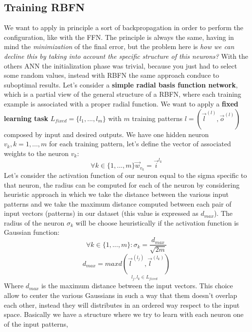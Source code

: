 \documentclass{article}
\begin{document}
\subsection{Training RBFN}
We want to apply in principle a sort of backpropagation in order to perform the configuration,
like with the FFN.
The principle is always the same, having in mind the \textit{minimization} of the final error,
but the problem here is \textit{how we can decline this by taking into account the
    specific structure of this neurons?}
With the others ANN the initialization phase was trivial, because you just had to
select some random values, instead with RBFN the same approach conduce to suboptimal
results.
\newline\newline
Let's consider a \textbf{simple radial basis function network}, which is
a partial view of the general structure of a RBFN, where each training example is associated
with a proper radial function.
\newline\newline
We want to apply a \textbf{fixed learning task} $L_{fixed} = \{l_1,...,l_m\}$ with
$m$ training patterns $l=(\vec{l}^{(l)},\vec{o}^{(l)})$ composed by input and desired outputs.
\newline\newline
We have one hidden neuron $v_k, k=1,...,m$ for each training pattern, let's define the vector
of associated weights to the neuron $v_k$:
$$\forall k\in\{1,...,m\}\vec{w}_{v_k}=\vec{i}^{l_k}$$
Let's consider the activation function of our neuron equal to the sigma specific to that
neuron, the radius can be computed for each of the neuron by considering heuristic approach
in which we take the distance between the various input patterns and we take the maximum
distance computed between each pair of input vectors (patterns) in our dataset (this value
is expressed as $d_{max}$).
\newline\newline
The radius of the neuron $\sigma_k$ will be choose heuristically if the activation
function is Gaussian function:
$$\forall k\in\{1,...,m\}:\sigma_k = \frac{d_{max}}{\sqrt{2m}}$$
$$d_{max}=max\underset{l_j,l_k\in L_{fixed}}{d\left(\vec{l}^{(l_j)},\vec{l}^(l_k)\right)}$$
Where $d_{max}$ is the maximum distance between the input vectors.
This choice allow to center the various Gaussians in such a way that them doesn't overlap each other,
instead they will distributes in an ordered way respect to the input space.
Basically we have a structure where we try to learn with each neuron one of the input patterns,
\end{document}
